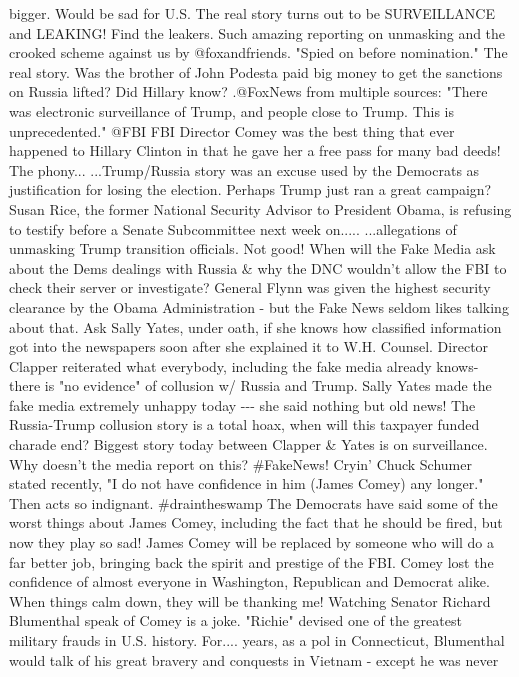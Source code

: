 bigger. Would be sad for U.S. The real story turns out to be
SURVEILLANCE and LEAKING! Find the leakers. Such amazing reporting on
unmasking and the crooked scheme against us by @foxandfriends. "Spied on
before nomination." The real story. Was the brother of John Podesta paid
big money to get the sanctions on Russia lifted? Did Hillary know?
.@FoxNews from multiple sources: "There was electronic surveillance of
Trump, and people close to Trump. This is unprecedented." @FBI FBI
Director Comey was the best thing that ever happened to Hillary Clinton
in that he gave her a free pass for many bad deeds! The phony...
...Trump/Russia story was an excuse used by the Democrats as
justification for losing the election. Perhaps Trump just ran a great
campaign? Susan Rice, the former National Security Advisor to President
Obama, is refusing to testify before a Senate Subcommittee next week
on..... ...allegations of unmasking Trump transition officials. Not
good! When will the Fake Media ask about the Dems dealings with Russia
\& why the DNC wouldn't allow the FBI to check their server or
investigate? General Flynn was given the highest security clearance by
the Obama Administration - but the Fake News seldom likes talking about
that. Ask Sally Yates, under oath, if she knows how classified
information got into the newspapers soon after she explained it to W.H.
Counsel. Director Clapper reiterated what everybody, including the fake
media already knows- there is "no evidence" of collusion w/ Russia and
Trump. Sally Yates made the fake media extremely unhappy today -\/-\/-
she said nothing but old news! The Russia-Trump collusion story is a
total hoax, when will this taxpayer funded charade end? Biggest story
today between Clapper \& Yates is on surveillance. Why doesn't the media
report on this? \#FakeNews! Cryin' Chuck Schumer stated recently, "I do
not have confidence in him (James Comey) any longer." Then acts so
indignant. \#draintheswamp The Democrats have said some of the worst
things about James Comey, including the fact that he should be fired,
but now they play so sad! James Comey will be replaced by someone who
will do a far better job, bringing back the spirit and prestige of the
FBI. Comey lost the confidence of almost everyone in Washington,
Republican and Democrat alike. When things calm down, they will be
thanking me! Watching Senator Richard Blumenthal speak of Comey is a
joke. "Richie" devised one of the greatest military frauds in U.S.
history. For.... years, as a pol in Connecticut, Blumenthal would talk
of his great bravery and conquests in Vietnam - except he was never
